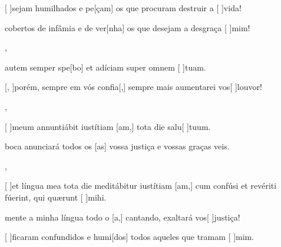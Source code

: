{    {\item {}[ ]{se}jam humilhados e pe[çam] os que procuram destruir a [ ]{vi}da!~\Antiphona
      \item {} cobertos de infâmia e de ver[nha] os que desejam a desgraça [ ]{mim}!~\Antiphona},
  {\item {} autem semper spe[bo] et adíciam super omnem [ ]{tu}am.~\Antiphona}%
    {\item {}[, ]{po}rém, sempre em vós confia[,] sempre mais aumentarei vos[ ]{lou}{vor}!~\Antiphona},
  {\item {}[ ]{me}um annuntiábit iustítiam [am,] tota die salu[ ]{tu}um.~\Antiphona}%
    {\item {} boca anunciará todos os [as] vossa justiça e vossas graças veis.~\Antiphona},
  {\item {}[ ]{et} língua mea tota die meditábitur iustítiam [am,] cum confúsi et revériti fúerint, qui quærunt [ ]{mi}hi.~\Antiphona}%
    {\item {}mente a minha língua todo o [a,] cantando, exaltará vos[ ]{jus}{ti}ça!~\Antiphona
      \item {}[ ]{fi}caram confundidos e humi[dos] todos aqueles que tramam [ ]{mim}.~\Antiphona}
}